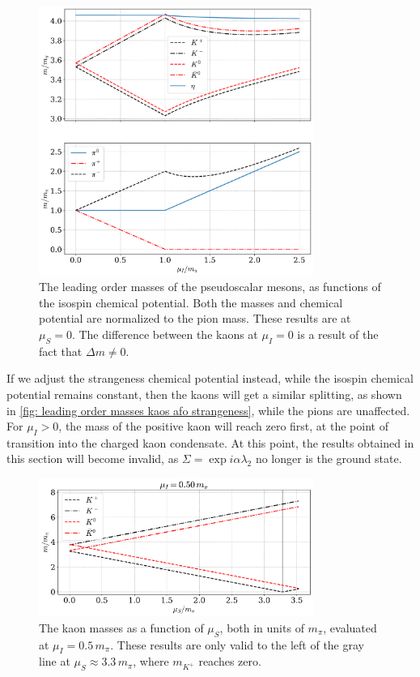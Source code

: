 \begin{figure}
    \centering
    \includegraphics[width=0.8\textwidth]{../scripts/figurer/masses_mesons.pdf}
    \caption{
        The leading order masses of the pseudoscalar mesons, as functions of the isospin chemical potential.
        Both the masses and chemical potential are normalized to the pion mass.
        These results are at $\mu_S = 0$.
        The difference between the kaons at $\mu_I = 0$ is a result of the fact that $\Delta m \neq 0$.
        }
    \label{fig: leading order masses mesons}
\end{figure}
%

If we adjust the strangeness chemical potential instead, while the isospin chemical potential remains constant, then the kaons will get a similar splitting, as shown in \autoref{fig: leading order masses kaos afo strangeness}, while the pions are unaffected.
For $\mu_I > 0$, the mass of the positive kaon will reach zero first, at the point of transition into the charged kaon condensate.
At this point, the results obtained in this section will become invalid, as $\Sigma = \exp{i \alpha \lambda_2}$ no longer is the ground state.


\begin{figure}
    \centering
    \includegraphics[width=0.8\textwidth]{../scripts/figurer/masses_kaons2.pdf}
    \caption{
        The kaon masses as a function of $\mu_S$, both in units of $m_\pi$, evaluated at $\mu_I = 0.5 \, m_\pi$.
        These results are only valid to the left of the gray line at $\mu_S\approx 3.3 \, m_\pi$, where $m_{K^+}$ reaches zero.
    }
    \label{fig: leading order masses kaos afo strangeness}
\end{figure}





